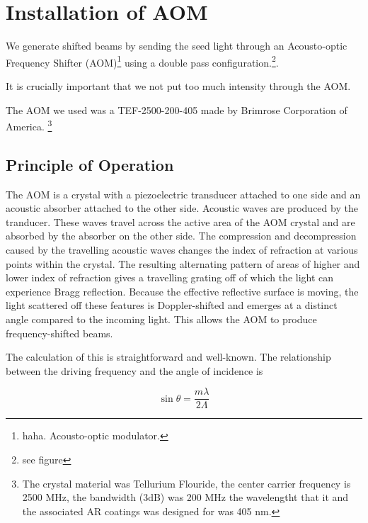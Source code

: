 \chapter{Installation of AOM}

We generate shifted beams by sending the seed light through an Acousto-optic Frequency Shifter (AOM)\footnote{haha. Acousto-optic modulator.} using a double pass configuration.\footnote{see figure}. 

It is crucially important that we not put too much intensity through the AOM. 

The AOM we used was a TEF-2500-200-405 made by Brimrose Corporation of America. \footnote{The crystal material was Tellurium Flouride, the center carrier frequency is 2500 MHz, the bandwidth (3dB) was 200 MHz the wavelengtht that it and the associated AR coatings was designed for was 405 nm.} 

\section{Principle of Operation}

The AOM is a crystal with a piezoelectric transducer attached to one side and an acoustic absorber attached to the other side. Acoustic waves are produced by the tranducer. These waves travel across the active area of the AOM crystal and are absorbed by the absorber on the other side. The compression and decompression caused by the travelling acoustic waves changes the index of refraction at various points within the crystal. The resulting alternating pattern of areas of higher and lower index of refraction gives a travelling grating off of which the light can experience Bragg reflection. Because the effective reflective surface is moving, the light scattered off these features is Doppler-shifted and emerges at a distinct angle compared to the incoming light. This allows the AOM to produce frequency-shifted beams. 

The calculation of this is straightforward and well-known. The relationship between the driving frequency and the angle of incidence is 


\begin{equation}
\sin{\theta}=\frac{m \lambda}{2 \Lambda}
\end{equation}



